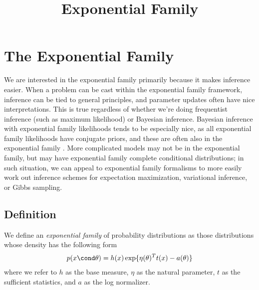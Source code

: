 \documentclass{article} %
\begin{document}
\title{Exponential Family} 

\maketitle

\tableofcontents
\newpage

\section{The Exponential Family} \label{sec:ef}

We are interested in the exponential family primarily because it makes inference easier.   When a problem can be cast within the exponential family framework,  inference can be tied to general principles,  and parameter updates often have nice interpretations.    This is true regardless of whether we're doing frequentist inference (such as maximum likelihood) or Bayesian inference.    Bayesian inference with exponential family likelihoods tends to be especially nice,  as all exponential family likelihoods have conjugate priors,  and these are often also in the exponential family \cite{bernardo2009bayesian}.    More complicated models may not be in the exponential family,  but may have exponential family complete conditional distributions;  in such situation,  we can appeal to exponential family formalisms to more easily work out inference schemes for expectation maximization,  variational inference,  or Gibbs sampling.   

\subsection{Definition}
We define an \textit{exponential family} of probability distributions as those distributions whose density has the following form
\begin{align}
\label{eqn:exponential_family}
 p(x \cond \theta) = h(x) \exp \{ \eta(\theta)^T t(x) - a(\theta)\} 
 \end{align}
where we refer to $h$ as the base measure, $\eta$ as the natural parameter, $t$ as the sufficient statistics, and $a$ as the log normalizer.  
\end{document}
